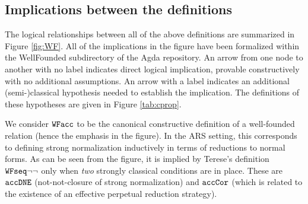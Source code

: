 \subsection{Implications between the definitions}

The logical relationships between all of the above definitions are summarized in Figure \ref{fig:WF}.
All of the implications in the figure have been
formalized within the WellFounded subdirectory of the Agda repository.
An arrow from one node to another with no label indicates direct logical implication,
provable constructively with no additional assumptions. An arrow with a label indicates an additional
(semi-)classical hypothesis needed to establish the implication.
The definitions of these hypotheses are given in Figure \ref{tab:cprop}.

We consider $\mathtt{WFacc}$ to be the canonical constructive definition of
a well-founded relation (hence the emphasis in the figure).
In the ARS setting, this corresponds to defining
strong normalization inductively in terms of reductions to normal forms.
As can be seen from the figure, it is implied by
Terese's definition $\mathtt{WFseq}{\lnot\lnot}$ only when \emph{two}
strongly classical conditions are in place.
These are $\mathtt{accDNE}$ (not-not-closure of strong normalization)
and $\mathtt{accCor}$ (which is related to the existence of an effective perpetual reduction strategy).

